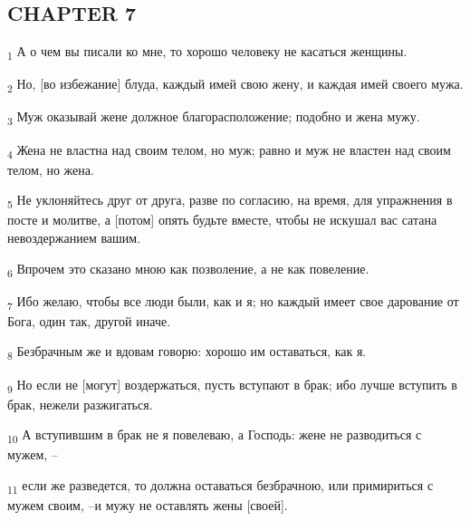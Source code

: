 \subsection{CHAPTER 7}
\begin{tcolorbox}
\textsubscript{1} А о чем вы писали ко мне, то хорошо человеку не касаться женщины.
\end{tcolorbox}
\begin{tcolorbox}
\textsubscript{2} Но, [во избежание] блуда, каждый имей свою жену, и каждая имей своего мужа.
\end{tcolorbox}
\begin{tcolorbox}
\textsubscript{3} Муж оказывай жене должное благорасположение; подобно и жена мужу.
\end{tcolorbox}
\begin{tcolorbox}
\textsubscript{4} Жена не властна над своим телом, но муж; равно и муж не властен над своим телом, но жена.
\end{tcolorbox}
\begin{tcolorbox}
\textsubscript{5} Не уклоняйтесь друг от друга, разве по согласию, на время, для упражнения в посте и молитве, а [потом] опять будьте вместе, чтобы не искушал вас сатана невоздержанием вашим.
\end{tcolorbox}
\begin{tcolorbox}
\textsubscript{6} Впрочем это сказано мною как позволение, а не как повеление.
\end{tcolorbox}
\begin{tcolorbox}
\textsubscript{7} Ибо желаю, чтобы все люди были, как и я; но каждый имеет свое дарование от Бога, один так, другой иначе.
\end{tcolorbox}
\begin{tcolorbox}
\textsubscript{8} Безбрачным же и вдовам говорю: хорошо им оставаться, как я.
\end{tcolorbox}
\begin{tcolorbox}
\textsubscript{9} Но если не [могут] воздержаться, пусть вступают в брак; ибо лучше вступить в брак, нежели разжигаться.
\end{tcolorbox}
\begin{tcolorbox}
\textsubscript{10} А вступившим в брак не я повелеваю, а Господь: жене не разводиться с мужем, --
\end{tcolorbox}
\begin{tcolorbox}
\textsubscript{11} если же разведется, то должна оставаться безбрачною, или примириться с мужем своим, --и мужу не оставлять жены [своей].
\end{tcolorbox}
